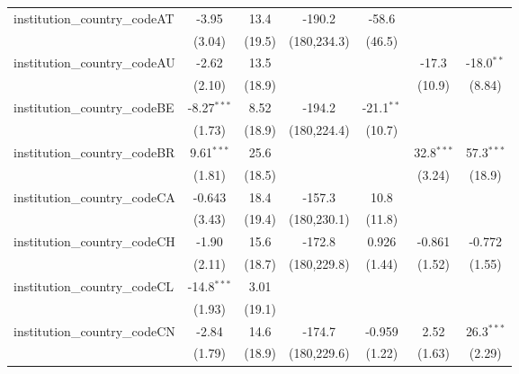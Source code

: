 \begin{tabular}{lcccccc}
   institution\_country\_codeAT          & -3.95         & 13.4         & -190.2        & -58.6         &               &   \\   
                                         & (3.04)        & (19.5)       & (180,234.3)   & (46.5)        &               &   \\   
   institution\_country\_codeAU          & -2.62         & 13.5         &               &               & -17.3         & -18.0$^{**}$\\   
                                         & (2.10)        & (18.9)       &               &               & (10.9)        & (8.84)\\   
   institution\_country\_codeBE          & -8.27$^{***}$ & 8.52         & -194.2        & -21.1$^{**}$  &               &   \\   
                                         & (1.73)        & (18.9)       & (180,224.4)   & (10.7)        &               &   \\   
   institution\_country\_codeBR          & 9.61$^{***}$  & 25.6         &               &               & 32.8$^{***}$  & 57.3$^{***}$\\   
                                         & (1.81)        & (18.5)       &               &               & (3.24)        & (18.9)\\   
   institution\_country\_codeCA          & -0.643        & 18.4         & -157.3        & 10.8          &               &   \\   
                                         & (3.43)        & (19.4)       & (180,230.1)   & (11.8)        &               &   \\   
   institution\_country\_codeCH          & -1.90         & 15.6         & -172.8        & 0.926         & -0.861        & -0.772\\   
                                         & (2.11)        & (18.7)       & (180,229.8)   & (1.44)        & (1.52)        & (1.55)\\   
   institution\_country\_codeCL          & -14.8$^{***}$ & 3.01         &               &               &               &   \\   
                                         & (1.93)        & (19.1)       &               &               &               &   \\   
   institution\_country\_codeCN          & -2.84         & 14.6         & -174.7        & -0.959        & 2.52          & 26.3$^{***}$\\   
                                         & (1.79)        & (18.9)       & (180,229.6)   & (1.22)        & (1.63)        & (2.29)\\   

\end{tabular}
